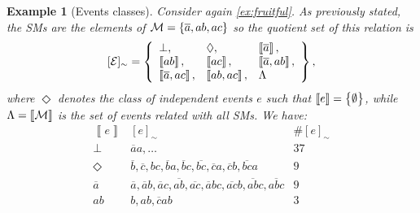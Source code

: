 \documentclass{tlp}
\newtheorem{example}{Example}
\newcommand{\cla}[1]{\ensuremath{{\cal #1}}}        %
\newcommand{\co}[1]{\ensuremath{\overline{#1}}}     %
\newcommand{\MODELset}{\ensuremath{\cla{M}}}
\newcommand{\EVENTSset}{\ensuremath{\cla{E}}}
\newcommand{\stablecore}[1]{\ensuremath{\left\llbracket #1 \right\rrbracket}}
\newcommand{\inconsistent}{\bot}
\newcommand{\bottomclass}{\ensuremath{\Lambda}}
\newcommand{\indepclass}{\ensuremath{\Diamond}}
\newcommand{\class}[1]{\ensuremath{[{#1}]_{\sim}}}
\begin{document}
\begin{example}[Events classes]\label{ex:classes}\em
  Consider again \cref{ex:fruitful}.  As previously stated, the
  \aclp{SM} are the elements of \(\MODELset = \set{\co{a}, ab, ac}\)
  so the quotient set of this relation is
    \begin{equation*}
        \class{\EVENTSset} = \set{
            \begin{array}{lll}
                \inconsistent,           &
                \indepclass,             &
                \stablecore{\co{a}},       \\
                \stablecore{ab},         &
                \stablecore{ac},         &
                \stablecore{\co{a}, ab},   \\
                \stablecore{\co{a}, ac}, &
                \stablecore{ab, ac},     &
                \bottomclass
            \end{array}
        },
    \end{equation*}
    where \(\indepclass\) denotes the class of \emph{independent
      events} \(e\) such that \(\stablecore{e} = \set{\emptyset}\),
    while \(\bottomclass = \stablecore{\MODELset}\) is the set of
    events related with all \acp{SM}.  We have:
    \begin{equation*}
        \begin{array}{l|lr}
            \stablecore{e}
             & \class{e}
             & \# \class{e}                                                                       \\
            \hline
            \inconsistent
             & \co{a}a, \ldots
             & 37                                                                                 \\
            \indepclass
             & \co{b}, \co{c}, bc, \co{b}a, \co{b}c, \co{bc}, \co{c}a, \co{c}b, \co{bc}a
             & 9                                                                                  \\
            \co{a}
             & \co{a}, \co{a}b, \co{a}c, \co{ab}, \co{ac}, \co{a}bc, \co{ac}b, \co{ab}c, \co{abc}
             & 9                                                                                  \\
            ab
             & b, ab, \co{c}ab
             & 3                                                                                  \\

\end{array}
\end{equation*}
\end{example}
\end{document}
